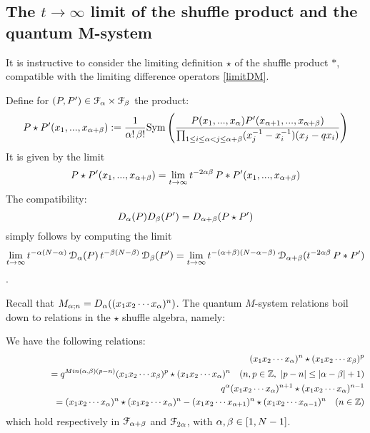 \subsection{The $t\to \infty$ limit of the shuffle product and the quantum M-system}

It is instructive to consider the limiting definition $\star$ of the shuffle product $*$, 
compatible with the limiting difference operators \eqref{limitDM}.

Define for $(P,P')\in {\mathcal F}_{\alpha}\times {\mathcal F}_\beta$ the product:
$$P\star P'(x_1,...,x_{{\alpha}+\beta}):=\frac{1}{{\alpha}!\, \beta!}{\rm Sym}\left( 
\frac{P(x_1,...,x_{\alpha})P'(x_{{\alpha}+1},...,x_{{\alpha}+\beta})}{\prod_{1\leq i\leq {\alpha}<j\leq {\alpha}+\beta} (x_j^{-1}-x_i^{-1})(x_j-q x_i)}\right)$$
It is given by the limit 
$$P\star P'(x_1,...,x_{{\alpha}+\beta})=\lim_{t\to\infty} t^{-2{\alpha}\beta}\, P*P'(x_1,...,x_{{\alpha}+\beta})$$
The compatibility:
$$D_{\alpha}(P)D_\beta(P')=D_{{\alpha}+\beta}(P\star P')$$
simply follows by computing the limit
$$\lim_{t\to\infty} t^{-{\alpha}(N-{\alpha})}\, {\mathcal D}_{\alpha}(P)\, t^{-\beta(N-\beta)}\,{\mathcal D}_\beta(P')
=\lim_{t\to\infty} t^{-({\alpha}+\beta)(N-{\alpha}-\beta)}\,{\mathcal D}_{{\alpha}+\beta}(t^{-2{\alpha}\beta}\,P*P')$$.

Recall that $M_{{\alpha};n}=D_{\alpha}((x_1x_2\cdots x_{\alpha})^n)$. The quantum $M$-system relations
boil down to relations in the $\star$ shuffle algebra, namely:

\begin{thm}\label{msyshuf}
We have the following relations:
\begin{eqnarray*}
&&(x_1x_2\cdots x_\al)^n\star (x_1x_2\cdots x_\beta)^p\\
&&\qquad\qquad=q^{Min(\al,\beta)(p-n)}
(x_1x_2\cdots x_\beta)^p\star (x_1x_2\cdots x_\al)^n\quad (n,p\in \Z,\ |p-n|\leq |\al-\beta|+1)\\
&& q^\al (x_1x_2\cdots x_\al)^{n+1}\star (x_1x_2\cdots x_\al)^{n-1}\\
&&\qquad\qquad=
(x_1x_2\cdots x_\al)^n\star (x_1x_2\cdots x_\al)^n -
(x_1x_2\cdots x_{\al+1})^n\star (x_1x_2\cdots x_{\al-1})^n\quad (n\in \Z)
\end{eqnarray*}
which hold respectively in ${\mathcal F}_{{\alpha}+\beta}$ and ${\mathcal F}_{2{\alpha}}$, with ${\alpha},\beta\in [1,N-1]$.
\end{thm}

